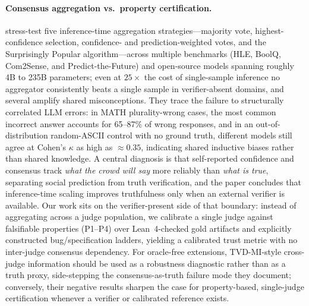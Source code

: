 \documentclass{article}
\begin{document}
\paragraph{Consensus aggregation vs.\ property certification.}
\citet{denisovblanch2026consensus} stress-test five inference-time aggregation strategies---majority vote, highest-confidence selection, confidence- and prediction-weighted votes, and the Surprisingly Popular algorithm---across multiple benchmarks (HLE, BoolQ, Com2Sense, and Predict-the-Future) and open-source models spanning roughly 4B to 235B parameters; even at $25\times$ the cost of single-sample inference no aggregator consistently beats a single sample in verifier-absent domains, and several amplify shared misconceptions.
They trace the failure to structurally correlated LLM errors: in MATH plurality-wrong cases, the most common incorrect answer accounts for 65--87\% of wrong responses, and in an out-of-distribution random-ASCII control with no ground truth, different models still agree at Cohen's $\kappa$ as high as ${\approx}0.35$, indicating shared inductive biases rather than shared knowledge.
A central diagnosis is that self-reported confidence and consensus track \emph{what the crowd will say} more reliably than \emph{what is true}, separating social prediction from truth verification, and the paper concludes that inference-time scaling improves truthfulness only when an external verifier is available.
Our work sits on the verifier-present side of that boundary: instead of aggregating across a judge population, we calibrate a single judge against falsifiable properties (P1--P4) over Lean~4-checked gold artifacts and explicitly constructed bug/specification ladders, yielding a calibrated trust metric with no inter-judge consensus dependency.
For oracle-free extensions, TVD-MI-style cross-judge information should be used as a robustness diagnostic rather than as a truth proxy, side-stepping the consensus-as-truth failure mode they document; conversely, their negative results sharpen the case for property-based, single-judge certification whenever a verifier or calibrated reference exists.
\end{document}
